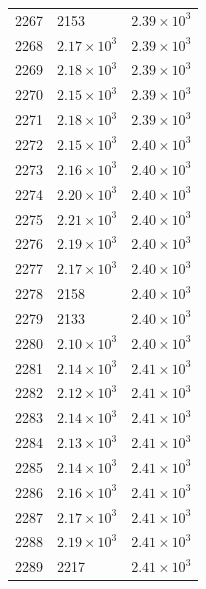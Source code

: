 \begin{table}[H]
\begin{tabular}{lll}
2267 & 2153 & $\displaystyle 2.39 \times 10^{3}$ \\
2268 & $\displaystyle 2.17 \times 10^{3}$ & $\displaystyle 2.39 \times 10^{3}$ \\
2269 & $\displaystyle 2.18 \times 10^{3}$ & $\displaystyle 2.39 \times 10^{3}$ \\
2270 & $\displaystyle 2.15 \times 10^{3}$ & $\displaystyle 2.39 \times 10^{3}$ \\
2271 & $\displaystyle 2.18 \times 10^{3}$ & $\displaystyle 2.39 \times 10^{3}$ \\
2272 & $\displaystyle 2.15 \times 10^{3}$ & $\displaystyle 2.40 \times 10^{3}$ \\
2273 & $\displaystyle 2.16 \times 10^{3}$ & $\displaystyle 2.40 \times 10^{3}$ \\
2274 & $\displaystyle 2.20 \times 10^{3}$ & $\displaystyle 2.40 \times 10^{3}$ \\
2275 & $\displaystyle 2.21 \times 10^{3}$ & $\displaystyle 2.40 \times 10^{3}$ \\
2276 & $\displaystyle 2.19 \times 10^{3}$ & $\displaystyle 2.40 \times 10^{3}$ \\
2277 & $\displaystyle 2.17 \times 10^{3}$ & $\displaystyle 2.40 \times 10^{3}$ \\
2278 & 2158 & $\displaystyle 2.40 \times 10^{3}$ \\
2279 & 2133 & $\displaystyle 2.40 \times 10^{3}$ \\
2280 & $\displaystyle 2.10 \times 10^{3}$ & $\displaystyle 2.40 \times 10^{3}$ \\
2281 & $\displaystyle 2.14 \times 10^{3}$ & $\displaystyle 2.41 \times 10^{3}$ \\
2282 & $\displaystyle 2.12 \times 10^{3}$ & $\displaystyle 2.41 \times 10^{3}$ \\
2283 & $\displaystyle 2.14 \times 10^{3}$ & $\displaystyle 2.41 \times 10^{3}$ \\
2284 & $\displaystyle 2.13 \times 10^{3}$ & $\displaystyle 2.41 \times 10^{3}$ \\
2285 & $\displaystyle 2.14 \times 10^{3}$ & $\displaystyle 2.41 \times 10^{3}$ \\
2286 & $\displaystyle 2.16 \times 10^{3}$ & $\displaystyle 2.41 \times 10^{3}$ \\
2287 & $\displaystyle 2.17 \times 10^{3}$ & $\displaystyle 2.41 \times 10^{3}$ \\
2288 & $\displaystyle 2.19 \times 10^{3}$ & $\displaystyle 2.41 \times 10^{3}$ \\
2289 & 2217 & $\displaystyle 2.41 \times 10^{3}$ \\

\end{tabular}
\end{table}
